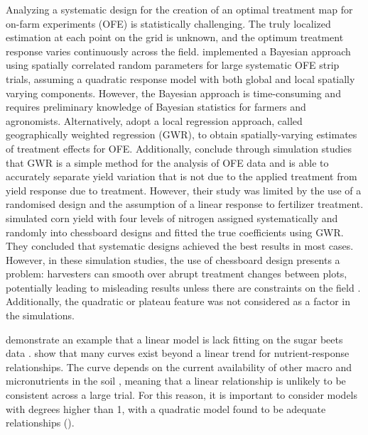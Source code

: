 \documentclass[a4paper]{article} 	%
\begin{document}
Analyzing a systematic design for the creation of an optimal treatment map for on-farm experiments (OFE) is statistically challenging. The truly localized estimation at each point on the grid is unknown, and the optimum treatment response varies continuously across the field. \textcite{Cao2022Bayesian} implemented a Bayesian approach using spatially correlated random parameters for large systematic OFE strip trials, assuming a quadratic response model with both global and local spatially varying components. However, the Bayesian approach is time-consuming and requires preliminary knowledge of Bayesian statistics for farmers and agronomists. Alternatively, \textcite{Rakshit2020Novel} adopt a local regression approach, called geographically weighted regression (GWR), to obtain spatially-varying estimates of treatment effects for OFE. Additionally, \textcite{Evans2020Assessment} conclude through simulation studies that GWR is a simple method for the analysis of OFE data and is able to accurately separate yield variation that is not due to the applied treatment from yield response due to treatment. However, their study was limited by the use of a randomised design and the assumption of a linear response to fertilizer treatment. \textcite{Alesso2021Design} simulated corn yield with four levels of nitrogen assigned systematically and randomly into chessboard designs and fitted the true coefficients using GWR. They concluded that systematic designs achieved the best results in most cases. However, in these simulation studies, the use of chessboard design presents a problem: harvesters can smooth over abrupt treatment changes between plots, potentially leading to misleading results unless there are constraints on the field \parencite{Pringle2004FieldScale}. Additionally, the quadratic or plateau feature was not considered as a factor in the simulations.


\textcite{Piepho2018Tutorial} demonstrate an example that a linear model is lack fitting on the sugar beets data \parencite{Petersen1994Agricultural}. \textcite{Glynn2007} show that many curves exist beyond a linear trend for nutrient-response relationships. The curve depends on the current availability of other macro and micronutrients in the soil \parencite{Marschner2011}, meaning that a linear relationship is unlikely to be consistent across a large trial. For this reason, it is important to consider models with degrees higher than 1, with a quadratic model found to be adequate relationships (\textcite{Piepho2018Tutorial, Liben2019}). 
\end{document}
